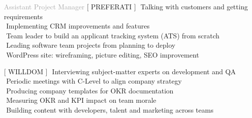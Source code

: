 
\begin{cvtable}

\bigskip

{\textcolor{darkgray}{Assistant Project Manager}}%
{[ {P\scriptsize REFERATI} ]}%
{%
     \textperiodcentered $ $ %
     Talking with customers and getting requirements \\
     \textperiodcentered $ $ Implementing CRM improvements and features \\
     \textperiodcentered $ $ Team leader to build an applicant tracking system (ATS) from scratch \\
     \textperiodcentered $ $ Leading software team projects from planning to deploy \\
     \textperiodcentered $ $ WordPress site: wireframing, picture editing, SEO improvement %
} %
 
\bigskip
 
{\textcolor{darkgray}{}}%
{[ {W\scriptsize ILL}{D\scriptsize OM} ]}%
{%
    \textperiodcentered $ $ Interviewing subject-matter experts on development and QA \\
    \textperiodcentered $ $ Periodic meetings with C-Level to align company strategy  \\
    \textperiodcentered $ $ Producing company templates for OKR documentation \\
    \textperiodcentered $ $ Measuring OKR and KPI impact on team morale \\
    \textperiodcentered $ $ Building content with developers, talent and marketing across teams \\
} 

\bigskip


\end{cvtable}
